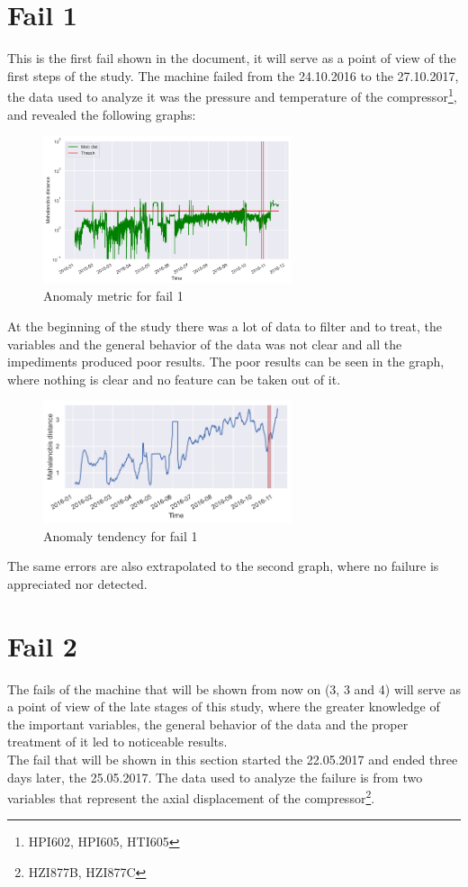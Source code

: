 \documentclass[11pt,twoside]{article}
\begin{document}
\section{Fail 1}
This is the first fail shown in the document, it will serve as a point of view
of the first steps of the study. The machine failed from the 24.10.2016 to the
27.10.2017, the data used to analyze it was the pressure and temperature of the
compressor\footnote{HPI602, HPI605, HTI605}, and revealed the following graphs:\\


\begin{figure}[h!]
\centering
\includegraphics[width=0.65\textwidth]{4_4_AM_label.png}
\caption{Anomaly metric for fail 1}\label{screenshots}
\end{figure}
At the beginning of the study there was a lot of data to filter and to treat,
the variables and the general behavior of the data was not clear and all the 
impediments produced poor results. The poor results can be seen in the graph,
where nothing is clear and no feature can be taken out of it.

\begin{figure}[h!]
\centering
\includegraphics[width=0.65\textwidth]{4_4_T_label.png}
\caption{Anomaly tendency for fail 1}\label{screenshots}
\end{figure}
The same errors are also extrapolated to the second graph, where no failure
is appreciated nor detected.

\newpage
\section{Fail 2}
The fails of the machine that will be shown from now on (3, 3 and 4) will serve as a point of view
of the late stages of this study, where the greater knowledge of the important variables, the
general behavior of the data and the proper treatment of it led to noticeable results.\\
The fail that will be shown in this section started the 22.05.2017 and ended three days later, the
25.05.2017. The data used to analyze the failure is from two variables that represent the axial
displacement of the compressor\footnote{HZI877B, HZI877C}.
\end{document}
